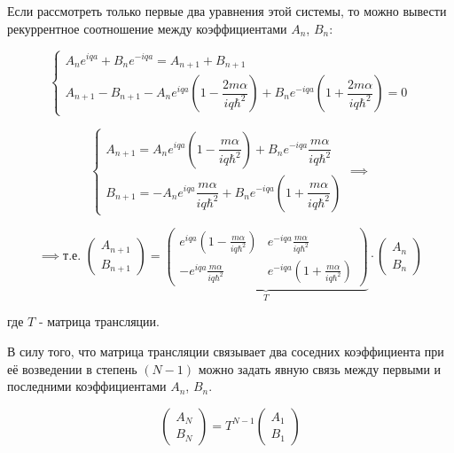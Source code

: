 \documentclass[a4paper, 12pt]{article}
\begin{document}
	\quad Если рассмотреть только первые два уравнения этой системы, то можно вывести рекуррентное соотношение между коэффициентами $A_n$, $B_n$: 
	
	\begin{equation}
		\begin{cases}
			A_n e^{iqa} + B_n e^{-iqa} = A_{n+1} + B_{n+1} \\
			A_{n+1} - B_{n+1} - A_n e^{iqa} \left(1 - \dfrac{2m\alpha}{iq\hbar^2} \right) + B_n e^{-iqa} \left(1 + \dfrac{2m\alpha}{iq\hbar^2} \right) = 0 
		\end{cases}
	\end{equation}
	
	\begin{equation}
		\begin{cases}
			A_{n+1} = A_n e^{iqa} \left(1 - \dfrac{m\alpha}{iq\hbar^2}\right) + B_n e^{-iqa} \dfrac{m\alpha}{iq\hbar^2} \\
			B_{n+1} = -A_n e^{iqa} \dfrac{m\alpha}{iq\hbar^2} + B_n e^{-iqa} \left(1+ \dfrac{m\alpha}{iq\hbar^2}\right) 
		\end{cases} \implies
	\end{equation}
	
	\begin{equation}
		\implies \text{т.е. } \left(\begin{array}{c}
			A_{n+1} \\
			B_{n+1} 
		\end{array} \right)= \underbrace{\left(\begin{array}{cc}
				e^{iqa} \left(1 - \frac{m\alpha}{iq\hbar^2}\right) & e^{-iqa} \frac{m\alpha}{iq\hbar^2} \\
				-e^{iqa} \frac{m\alpha}{iq\hbar^2} & e^{-iqa} \left(1+ \frac{m\alpha}{iq\hbar^2}\right) 
			\end{array}\right) }_{T} \cdot \left(\begin{array}{c}
			A_n \\
			B_n
		\end{array}\right)
	\end{equation}
	
	\quad где $T$ - матрица трансляции. 
	
	\quad В силу того, что матрица трансляции связывает два соседних коэффициента при её возведении в степень $(N-1)$ можно задать явную связь между первыми и последними коэффициентами $A_n$, $B_n$. 
	
	\begin{equation}
		\left(\begin{array}{c}
			A_N \\
			B_N 
		\end{array}\right) = T^{N-1} \left(\begin{array}{c}
			A_1 \\
			B_1
		\end{array}\right)
	\end{equation}
	
\end{document}
